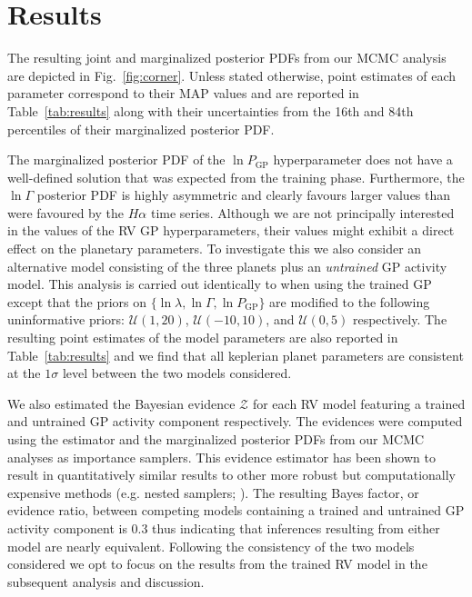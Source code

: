\documentclass[longauth]{aa}
\begin{document}
\section{Results}
\label{sec:results} 
The resulting joint and marginalized posterior PDFs from our MCMC analysis are depicted in Fig.~\ref{fig:corner}. Unless stated otherwise, point estimates of each parameter correspond to their MAP values and are reported in Table~\ref{tab:results} along with their uncertainties from the 16th and 84th percentiles of their marginalized posterior PDF.

The marginalized posterior PDF of the $\ln{P_{\text{GP}}}$ hyperparameter does not have a well-defined solution that was expected from the training phase. Furthermore, the $\ln{\Gamma}$ posterior PDF is highly asymmetric and clearly favours larger values than were favoured by the $H\alpha$ time series. Although we are not principally interested in the values of the RV GP hyperparameters, their values might exhibit a direct effect on the planetary parameters. To investigate this we also consider an alternative model consisting of the three planets plus an \emph{untrained} GP activity model. This analysis is carried out identically to when using the trained GP except that the priors on $\{ \ln{\lambda}, \ln{\Gamma}, \ln{P_{\text{GP}}} \}$ are modified to the following uninformative priors: $\mathcal{U}(1,20)$, $\mathcal{U}(-10,10)$, and $\mathcal{U}(0,5)$ respectively. The resulting point estimates of the model parameters are also reported in Table~\ref{tab:results} and we find that all keplerian planet parameters are consistent at the $1\sigma$ level between the two models considered. 

We also estimated the Bayesian evidence $\mathcal{Z}$ for each RV model featuring a trained and untrained GP activity component respectively. The evidences were computed using the \cite{perrakis14} estimator and the marginalized posterior PDFs from our MCMC analyses as importance samplers. This evidence estimator has been shown to result in quantitatively similar results to other more robust but computationally expensive methods (e.g. nested samplers; \citealt{nelson18}). The resulting Bayes factor, or evidence ratio, between competing models containing a trained and untrained GP activity component is 0.3 thus indicating that inferences resulting from either model are nearly equivalent. Following the consistency of the two models considered we opt to focus on the results from the trained RV model in the subsequent analysis and discussion.
\end{document}
